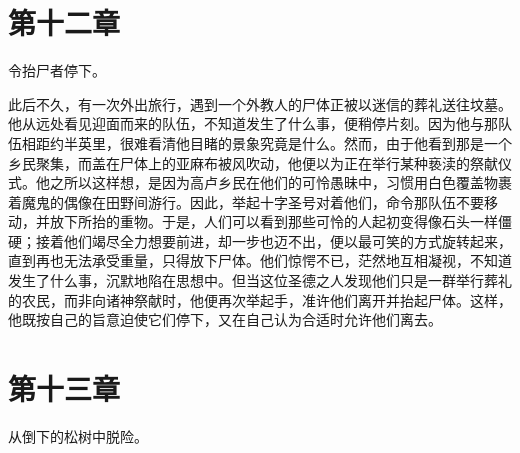 
\section{第十二章}

令抬尸者停下。\par

此后不久，有一次外出旅行，遇到一个外教人的尸体正被以迷信的葬礼送往坟墓。他从远处看见迎面而来的队伍，不知道发生了什么事，便稍停片刻。因为他与那队伍相距约半英里，很难看清他目睹的景象究竟是什么。然而，由于他看到那是一个乡民聚集，而盖在尸体上的亚麻布被风吹动，他便以为正在举行某种亵渎的祭献仪式。他之所以这样想，是因为高卢乡民在他们的可怜愚昧中，习惯用白色覆盖物裹着魔鬼的偶像在田野间游行。因此，举起十字圣号对着他们，命令那队伍不要移动，并放下所抬的重物。于是，人们可以看到那些可怜的人起初变得像石头一样僵硬；接着他们竭尽全力想要前进，却一步也迈不出，便以最可笑的方式旋转起来，直到再也无法承受重量，只得放下尸体。他们惊愕不已，茫然地互相凝视，不知道发生了什么事，沉默地陷在思想中。但当这位圣德之人发现他们只是一群举行葬礼的农民，而非向诸神祭献时，他便再次举起手，准许他们离开并抬起尸体。这样，他既按自己的旨意迫使它们停下，又在自己认为合适时允许他们离去。\par


\section{第十三章}

从倒下的松树中脱险。\par

